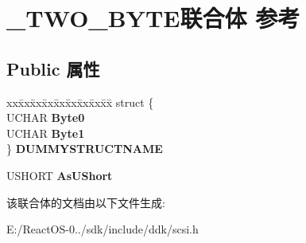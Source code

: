 \hypertarget{union___t_w_o___b_y_t_e}{}\section{\+\_\+\+T\+W\+O\+\_\+\+B\+Y\+T\+E联合体 参考}
\label{union___t_w_o___b_y_t_e}
\subsection*{Public 属性}
\begin{DoxyCompactItemize}
\item 
\mbox{\label{union___t_w_o___b_y_t_e_a4de07eb189cefba6c41c423bc4c5f608}} 
\begin{tabbing}
xx\=xx\=xx\=xx\=xx\=xx\=xx\=xx\=xx\=\kill
struct \{\\
\>UCHAR {\bfseries Byte0}\\
\>UCHAR {\bfseries Byte1}\\
\} {\bfseries DUMMYSTRUCTNAME}\\

\end{tabbing}\item 
\mbox{\label{union___t_w_o___b_y_t_e_a1c4b9a721a4d2defe616c8de18a2ecd2}} 
U\+S\+H\+O\+RT {\bfseries As\+U\+Short}
\end{DoxyCompactItemize}


该联合体的文档由以下文件生成\+:\begin{DoxyCompactItemize}
\item 
E\+:/\+React\+O\+S-\/0../sdk/include/ddk/scsi.\+h\end{DoxyCompactItemize}
